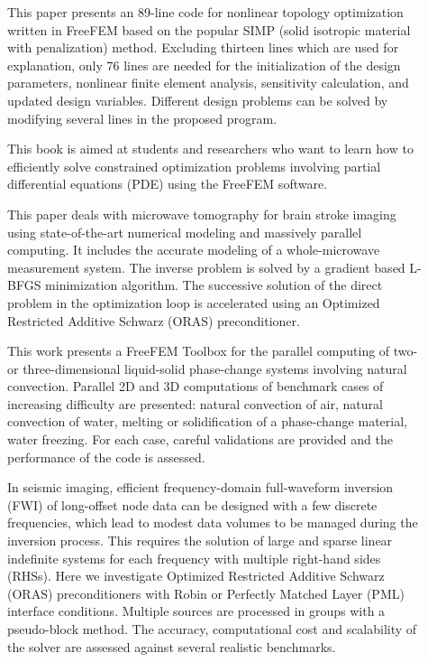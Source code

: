 \begin{description}
\item[] This paper presents an 89-line code for nonlinear topology optimization written in FreeFEM based on the popular SIMP (solid isotropic material with penalization) method. Excluding thirteen lines which are used for explanation, only 76 lines are needed for the initialization of the design parameters, nonlinear finite element analysis, sensitivity calculation, and updated design variables. Different design problems can be solved by modifying several lines in the proposed program.

\item[] This book is aimed at students and researchers who want to learn how to eﬃciently solve constrained optimization problems involving partial diﬀerential equations (PDE) using the FreeFEM software.

\item[] This paper deals with microwave tomography for brain stroke imaging using state-of-the-art numerical modeling and massively parallel computing. It includes the accurate modeling of a whole-microwave measurement system. The inverse problem is solved by a gradient based L-BFGS minimization algorithm. The successive solution of the direct problem in the optimization loop is accelerated using an Optimized Restricted Additive Schwarz (ORAS) preconditioner.

\item[] This work presents a FreeFEM Toolbox for the parallel computing of two- or three-dimensional liquid-solid phase-change systems involving natural convection. Parallel 2D and 3D computations of benchmark cases of increasing difficulty are presented: natural convection of air, natural convection of water, melting or solidification of a phase-change material, water freezing. For each case, careful validations are provided and the performance of the code is assessed. 

\item[] In seismic imaging, efficient frequency-domain full-waveform inversion (FWI) of long-offset node data can be designed with a few discrete frequencies, which lead to modest data volumes to be managed during the inversion process. This requires the solution of large and sparse linear indefinite systems for each frequency with multiple right-hand sides (RHSs). Here we investigate Optimized Restricted Additive Schwarz (ORAS) preconditioners with Robin or Perfectly Matched Layer (PML) interface conditions. Multiple sources are processed in groups with a pseudo-block method. The accuracy, computational cost and scalability of the solver are assessed against several realistic benchmarks.


\end{description}
